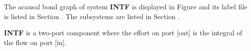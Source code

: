 

   The acausal bond graph of system \textbf{INTF} is
   displayed in Figure  and its label
   file is listed in Section .
   The subsystems are listed in Section .

\textbf{INTF} is a two-port component where the effort on port [out]
   is the integral of the flow on port [in].
